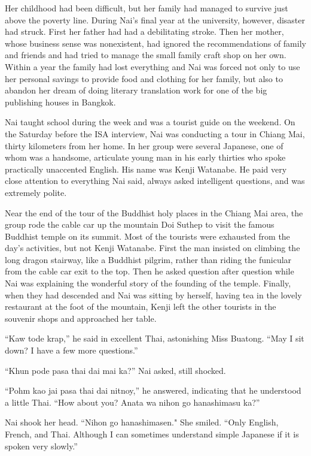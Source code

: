 \documentclass[]{article}
\begin{document}
{Her childhood had been difficult, but her family had managed to survive just above the poverty line.  During Nai’s final year at the university, however, disaster had struck.  First her father had had a debilitating stroke.  Then her mother, whose business sense was nonexistent, had ignored the recommendations of family and friends and had tried to manage the small family craft shop on her own.  Within a year the family had lost everything and Nai was forced not only to use her personal savings to provide food and clothing for her family, but also to abandon her dream of doing literary translation work for one of the big publishing houses in Bangkok.

Nai taught school during the week and was a tourist guide on the weekend.  On the Saturday before the ISA interview, Nai was conducting a tour in Chiang Mai, thirty kilometers from her home.  In her group were several Japanese, one of whom was a handsome, articulate young man in his early thirties who spoke practically unaccented English.  His name was Kenji Watanabe.  He paid very close attention to everything Nai said, always asked intelligent questions, and was extremely polite.

Near the end of the tour of the Buddhist holy places in the Chiang Mai area, the group rode the cable car up the mountain Doi Suthep to visit the famous Buddhist temple on its summit.  Most of the tourists were exhausted from the day’s activities, but not Kenji Watanabe.  First the man insisted on climbing the long dragon stairway, like a Buddhist pilgrim, rather than riding the funicular from the cable car exit to the top.  Then he asked question after question while Nai was explaining the wonderful story of the founding of the temple.  Finally, when they had descended and Nai was sitting by herself, having tea in the lovely restaurant at the foot of the mountain, Kenji left the other tourists in the souvenir shops and approached her table.

“Kaw tode krap,” he said in excellent Thai, astonishing Miss Buatong.  “May I sit down? I have a few more questions.”

“Khun pode pasa thai dai mai ka?” Nai asked, still shocked.

“Pohm kao jai pasa thai dai nitnoy,” he answered, indicating that he understood a little Thai.  “How about you? Anata wa nihon go hanashimasu ka?”

Nai shook her head.  “Nihon go hanashimasen."  She smiled.  “Only English, French, and Thai.  Although I can sometimes understand simple Japanese if it is spoken very slowly.”

}
\end{document}
